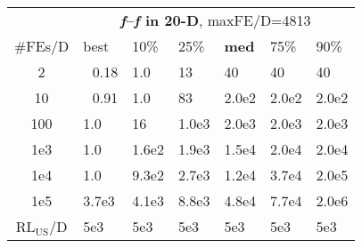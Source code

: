 \begin{tabular}{c|llllll}
 & \multicolumn{6}{|c}{\textbf{\textit{f}\raisebox{-0.35ex}{1}--\textit{f}\raisebox{-0.35ex}{24} in 20-D}, maxFE/D=4813}\\
\#FEs/D & best & 10\% & 25\% & \textbf{med} & 75\% & 90\%\\
2 & ~\,0.18 & \hspace*{1ex}1.0 & 13 & 40 & 40 & 40\\
10 & ~\,0.91 & \hspace*{1ex}1.0 & 83 & 2.0e2 & 2.0e2 & 2.0e2\\
100 & \hspace*{1ex}1.0 & 16 & 1.0e3 & 2.0e3 & 2.0e3 & 2.0e3\\
1e3 & \hspace*{1ex}1.0 & 1.6e2 & 1.9e3 & 1.5e4 & 2.0e4 & 2.0e4\\
1e4 & \hspace*{1ex}1.0 & 9.3e2 & 2.7e3 & 1.2e4 & 3.7e4 & 2.0e5\\
1e5 & 3.7e3 & 4.1e3 & 8.8e3 & 4.8e4 & 7.7e4 & 2.0e6\\
$\text{RL}_{\text{US}}$/D & 5e3 & 5e3 & 5e3 & 5e3 & 5e3 & 5e3
\end{tabular}
